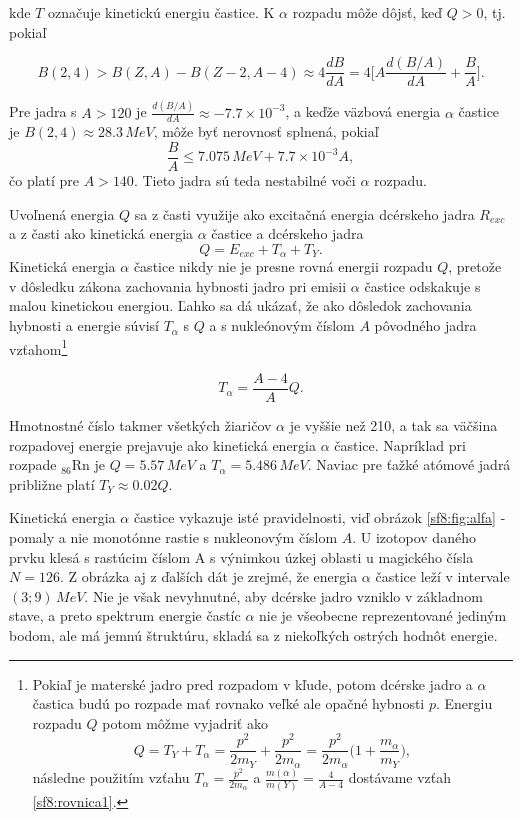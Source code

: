 \documentclass[../../main.tex]{subfiles}
\begin{document}
kde $T$ označuje kinetickú energiu častice. K $\alpha$ rozpadu môže dôjsť, keď $Q>0$, tj. pokiaľ

$$ B(2,4) > B(Z,A)-B(Z-2,A-4) \approx 4\frac{dB}{dA} = 4 \bigg[ A \frac{d(B/A)}{dA}+\frac{B}{A} \bigg].$$

Pre jadra s $A>120$ je $\frac{d(B/A)}{dA} \approx -7.7\times10^{-3}$, a keďže väzbová energia $\alpha$ častice je $B(2,4)\approx 28.3\,MeV$,
môže byť nerovnosť splnená, pokiaľ 
$$\frac{B}{A}\leq 7.075\,MeV + 7.7\times 10^{-3}A ,$$
čo platí pre $A>140$. Tieto jadra sú teda nestabilné voči $\alpha$ rozpadu.

Uvoľnená energia $Q$ sa z časti využije ako excitačná energia dcérskeho jadra $R_{exc}$ a z časti ako kinetická energia $\alpha$ častice a dcérskeho jadra
$$ Q = E_{exc}+T_{\alpha}+T_Y .$$
Kinetická energia $\alpha$ častice nikdy nie je presne rovná energii rozpadu $Q$, pretože v dôsledku zákona zachovania hybnosti jadro pri emisii $\alpha$ častice odskakuje s malou kinetickou energiou. Ľahko sa dá ukázať, že ako dôsledok zachovania hybnosti a energie súvisí $T_{\alpha}$
s $Q$ a s nukleónovým číslom $A$ pôvodného jadra vzťahom\footnote{Pokiaľ je materské jadro pred rozpadom v kľude, potom dcérske jadro a $\alpha$ častica budú po rozpade mať rovnako veľké ale opačné hybnosti $p$. Energiu rozpadu $Q$ potom môžme vyjadriť ako $$ Q=T_Y+T_{\alpha}=\frac{p^2}{2m_Y}+\frac{p^2}{2m_{\alpha}}= \frac{p^2}{2m_{\alpha}}\bigg(1 + \frac{m_{\alpha}}{m_Y} \bigg), $$ 
následne použitím vzťahu $T_{\alpha} = \frac{p^2}{2m_{\alpha}}$ a $\frac{m(\alpha)}{m(Y)}= \frac{4}{A-4}$ dostávame vzťah \ref{sf8:rovnica1}.} 

\begin{equation}
T_{\alpha} = \frac{A-4}{A}Q.
\label{sf8:rovnica1}
\end{equation}

Hmotnostné číslo takmer všetkých žiaričov $\alpha$ je vyššie než 210, a tak sa väčšina rozpadovej energie prejavuje ako kinetická energia $\alpha$ častice. Napríklad pri rozpade $_{86}$Rn je $Q = 5.57\,\unit{MeV}$ a $T_{\alpha}  = 5.486\,\unit{MeV}.$ Naviac pre ťažké atómové jadrá približne platí $T_Y\approx 0.02Q.$

Kinetická energia $\alpha$ častice vykazuje isté pravidelnosti, viď obrázok \ref{sf8:fig:alfa} - pomaly a nie monotónne rastie s nukleonovým číslom $A$. U izotopov daného prvku klesá s rastúcim číslom A s výnimkou úzkej oblasti u magického čísla $N=126$. Z obrázka aj z ďalších dát je zrejmé, že energia $\alpha$ častice leží v intervale $(3;9)\,\unit{MeV}$. Nie je však nevyhnutné, aby dcérske jadro vzniklo v základnom stave, a preto spektrum energie častíc $\alpha$ nie je všeobecne reprezentované jediným bodom, ale má jemnú štruktúru, skladá sa z niekoľkých ostrých hodnôt energie. 
\end{document}

